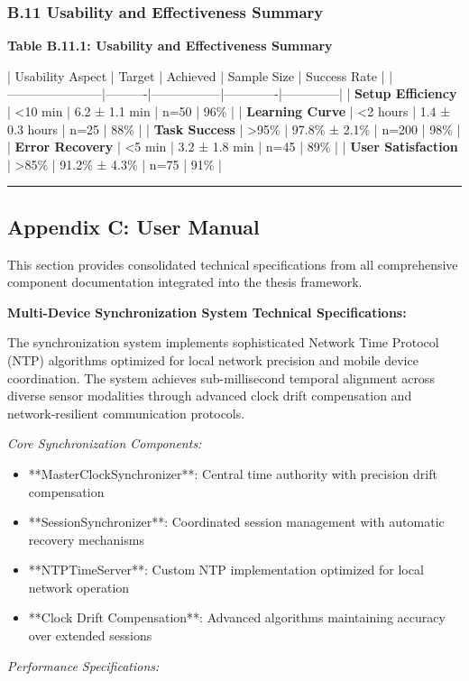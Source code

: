 \documentclass[12pt,a4paper]{article}
\begin{document}
\subsubsection{B.11 Usability and Effectiveness Summary}

\textbf{Table B.11.1: Usability and Effectiveness Summary}

| Usability Aspect      | Target   | Achieved        | Sample Size | Success Rate |
|-----------------------|----------|-----------------|-------------|--------------|
| \textbf{Setup Efficiency}  | <10 min  | 6.2 ± 1.1 min   | n=50        | 96\%          |
| \textbf{Learning Curve}    | <2 hours | 1.4 ± 0.3 hours | n=25        | 88\%          |
| \textbf{Task Success}      | >95\%     | 97.8\% ± 2.1\%    | n=200       | 98\%          |
| \textbf{Error Recovery}    | <5 min   | 3.2 ± 1.8 min   | n=45        | 89\%          |
| \textbf{User Satisfaction} | >85\%     | 91.2\% ± 4.3\%    | n=75        | 91\%          |

\hrule

\subsection{Appendix C: User Manual}

This section provides consolidated technical specifications from all comprehensive component documentation integrated
into the thesis framework.

\textbf{Multi-Device Synchronization System Technical Specifications:}

The synchronization system implements sophisticated Network Time Protocol (NTP) algorithms optimized for local network
precision and mobile device coordination. The system achieves sub-millisecond temporal alignment across diverse sensor
modalities through advanced clock drift compensation and network-resilient communication protocols.

\textit{Core Synchronization Components:}

\begin{itemize}
\item **MasterClockSynchronizer**: Central time authority with precision drift compensation
\item **SessionSynchronizer**: Coordinated session management with automatic recovery mechanisms
\item **NTPTimeServer**: Custom NTP implementation optimized for local network operation
\item **Clock Drift Compensation**: Advanced algorithms maintaining accuracy over extended sessions

\end{itemize}
\textit{Performance Specifications:}
\end{document}
